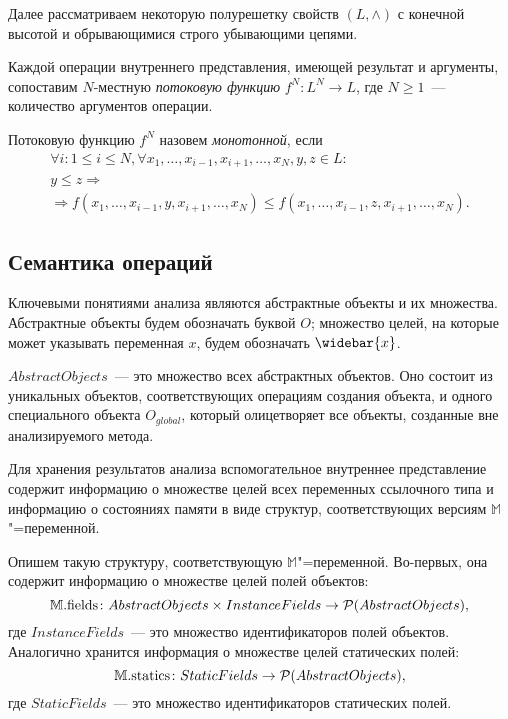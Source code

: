 \documentclass[14pt,titlepage,draft]{extarticle}
\newcommand{\M}{\ensuremath{\mathbb{M}}}
\newcommand{\Mfield}[1]{\ensuremath{\mathrm{#1}}}
\newcommand{\pts}[1]{\widebar{#1}}
\newcommand{\AO}[1]{O_{#1}}
\newcommand{\AOGlobal}{\AO{global}}
\newcommand{\meet}{\wedge}
\begin{document}

    Далее рассматриваем некоторую полурешетку свойств $(L, \meet)$ с конечной
    высотой и обрывающимися строго убывающими цепями.

    Каждой операции внутреннего представления, имеющей результат и аргументы,
    сопоставим $N$-местную \emph{потоковую функцию} $f^N \colon L^N \to L$, где
    $N \geq 1$~--- количество аргументов операции.

    Потоковую функцию $f^N$ назовем \emph{монотонной}, если
    \begin{gather*}
      \forall i\colon 1 \leq i \leq N,
      \forall x_1, \ldots, x_{i-1}, x_{i+1}, \ldots, x_N, y, z \in L \colon \\
        y \leq z \Rightarrow \\
        \Rightarrow
        f(x_1, \ldots, x_{i-1}, y, x_{i+1}, \ldots, x_N) \leq
        f(x_1, \ldots, x_{i-1}, z, x_{i+1}, \ldots, x_N).
    \end{gather*}

  \subsection{Семантика операций}
    \label{section:ops_semantic}


    Ключевыми понятиями анализа являются абстрактные объекты и их множества.
    Абстрактные объекты будем обозначать буквой $O$; множество целей, на
    которые может указывать переменная $x$, будем обозначать $\pts{x}$.

    $AbstractObjects$~--- это множество всех абстрактных объектов. Оно
    состоит из уникальных объектов, соответствующих операциям создания
    объекта, и одного специального объекта $\AOGlobal$, который олицетворяет
    все объекты, созданные вне анализируемого метода.

    Для хранения результатов анализа вспомогательное внутреннее представление
    содержит информацию о множестве целей всех переменных ссылочного
    типа и информацию о состояниях памяти в виде структур, соответствующих
    версиям \M"=переменной.

    Опишем такую структуру, соответствующую \M"=переменной. Во-первых, она
    содержит информацию о множестве целей полей объектов:
    \[ \M.\Mfield{fields}\colon
      AbstractObjects \times InstanceFields \to
      \powerset{AbstractObjects},
    \]
    где $InstanceFields$~--- это множество идентификаторов полей
    объектов. Аналогично хранится информация о множестве целей статических
    полей:
    \[ \M.\Mfield{statics}\colon
      StaticFields \to \powerset{AbstractObjects},
    \]
    где $StaticFields$~--- это множество идентификаторов
    статических полей.
\end{document}
